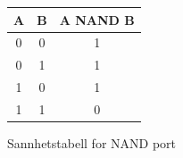     \begin{figure}[!htb]
        \centering
        \begin{tabular}{|c|c|c|}
            \hline
            \textbf{A} & \textbf{B} & \textbf{A NAND B} \\ \hline
            0 & 0 & 1 \\
            0 & 1 & 1 \\
            1 & 0 & 1 \\
            1 & 1 & 0 \\ \hline
        \end{tabular}
        \caption{Sannhetstabell for NAND port}
        \label{fig:tt_nand}
    \end{figure}
